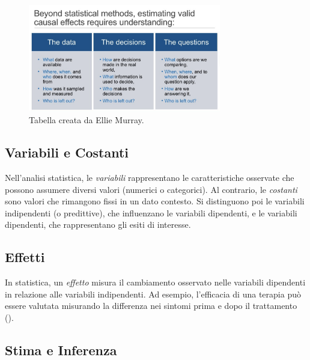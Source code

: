 \documentclass[
  letterpaper,
  DIV=11,
  numbers=noendperiod]{scrreprt}
\theoremstyle{definition}
\theoremstyle{remark}
\begin{document}
\begin{figure}[H]

{\centering \includegraphics[width=0.75\textwidth,height=\textheight]{chapters/key_notions/../../figures/data_biases.png}

}

\caption{Tabella creata da Ellie Murray.}

\end{figure}%

\subsection{Variabili e Costanti}\label{variabili-e-costanti}

Nell'analisi statistica, le \emph{variabili} rappresentano le
caratteristiche osservate che possono assumere diversi valori (numerici
o categorici). Al contrario, le \emph{costanti} sono valori che
rimangono fissi in un dato contesto. Si distinguono poi le variabili
indipendenti (o predittive), che influenzano le variabili dipendenti, e
le variabili dipendenti, che rappresentano gli esiti di interesse.

\subsection{Effetti}\label{effetti}

In statistica, un \emph{effetto} misura il cambiamento osservato nelle
variabili dipendenti in relazione alle variabili indipendenti. Ad
esempio, l'efficacia di una terapia può essere valutata misurando la
differenza nei sintomi prima e dopo il trattamento
().

\subsection{Stima e Inferenza}\label{stima-e-inferenza}
\end{document}
